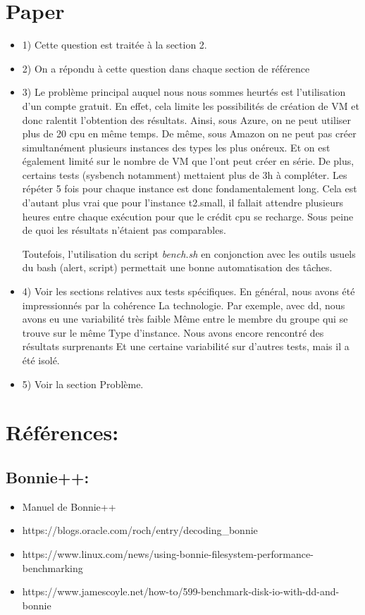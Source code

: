 \documentclass[11pt]{article}
\begin{document}
\section{Paper}
\begin{itemize}
	\item 1) Cette question est traitée à la section 2.
	\item 2) On a répondu à cette question dans chaque section de référence
	\item 3) Le problème principal auquel nous nous sommes heurtés est l'utilisation d'un compte gratuit. En effet, cela limite les possibilités de création de VM et donc ralentit l'obtention des résultats. Ainsi, sous Azure, on ne peut utiliser plus de 20 cpu en même temps. De même, sous Amazon on ne peut pas créer simultanément plusieurs instances des types les plus onéreux. Et on est également limité sur le nombre de VM que l'ont peut créer en série. De plus, certains tests (sysbench notamment) mettaient plus de 3h à compléter. Les répéter 5 fois pour chaque instance est donc fondamentalement long. Cela est d'autant plus vrai que pour l'instance t2.small, il fallait attendre plusieurs heures entre chaque exécution pour que le crédit cpu se recharge. Sous peine de quoi les résultats n'étaient pas comparables.
	
	Toutefois, l'utilisation du script \textit{bench.sh} en conjonction avec les outils usuels du bash (alert, script) permettait une bonne automatisation des tâches.
	\item 4) Voir les sections relatives aux tests spécifiques.
En général, nous avons été impressionnés par la cohérence
La technologie. Par exemple, avec dd, nous avons eu une variabilité très faible
Même entre le membre du groupe qui se trouve sur le même
Type d'instance. Nous avons encore rencontré des résultats surprenants
Et une certaine variabilité sur d'autres tests, mais il a été isolé.
	\item 5) Voir la section Problème.
\end{itemize}

\section{Références:}
\subsection{Bonnie++:}
\begin{itemize}
	\item Manuel de Bonnie++
	\item https://blogs.oracle.com/roch/entry/decoding\_bonnie
	\item https://www.linux.com/news/using-bonnie-filesystem-performance-benchmarking
	\item https://www.jamescoyle.net/how-to/599-benchmark-disk-io-with-dd-and-bonnie
\end{itemize}
\end{document}
